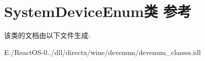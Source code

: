 \hypertarget{class_system_device_enum}{}\section{System\+Device\+Enum类 参考}
\label{class_system_device_enum}


该类的文档由以下文件生成\+:\begin{DoxyCompactItemize}
\item 
E\+:/\+React\+O\+S-\/0../dll/directx/wine/devenum/devenum\+\_\+classes.\+idl\end{DoxyCompactItemize}
